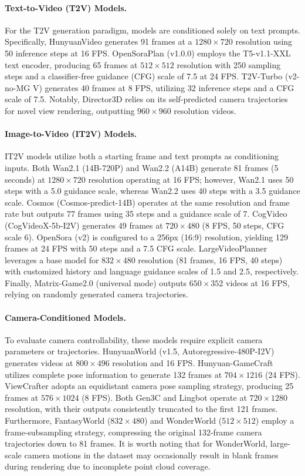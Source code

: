 \paragraph{Text-to-Video (T2V) Models.}
For the T2V generation paradigm, models are conditioned solely on text prompts. Specifically, HunyuanVideo generates 91 frames at a $1280\times 720$ resolution using 50 inference steps at 16 FPS. OpenSoraPlan (v1.0.0) employs the T5-v1.1-XXL text encoder, producing 65 frames at $512\times 512$ resolution with 250 sampling steps and a classifier-free guidance (CFG) scale of 7.5 at 24 FPS. T2V-Turbo (v2-no-MG V) generates 40 frames at 8 FPS, utilizing 32 inference steps and a CFG scale of 7.5. Notably, Director3D relies on its self-predicted camera trajectories for novel view rendering, outputting $960\times 960$ resolution videos.

\paragraph{Image-to-Video (IT2V) Models.}
IT2V models utilize both a starting frame and text prompts as conditioning inputs. Both Wan2.1 (14B-720P) and Wan2.2 (A14B) generate 81 frames (5 seconds) at $1280\times 720$ resolution operating at 16 FPS; however, Wan2.1 uses 50 steps with a 5.0 guidance scale, whereas Wan2.2 uses 40 steps with a 3.5 guidance scale. Cosmos (Cosmos-predict-14B) operates at the same resolution and frame rate but outputs 77 frames using 35 steps and a guidance scale of 7. CogVideo (CogVideoX-5b-I2V) generates 49 frames at $720\times 480$ (8 FPS, 50 steps, CFG scale 6). OpenSora (v2) is configured to a 256px (16:9) resolution, yielding 129 frames at 24 FPS with 50 steps and a 7.5 CFG scale. LargeVideoPlanner leverages a base model for $832\times 480$ resolution (81 frames, 16 FPS, 40 steps) with customized history and language guidance scales of 1.5 and 2.5, respectively. Finally, Matrix-Game2.0 (universal mode) outputs $650\times 352$ videos at 16 FPS, relying on randomly generated camera trajectories.

\paragraph{Camera-Conditioned Models.}
To evaluate camera controllability, these models require explicit camera parameters or trajectories. HunyuanWorld (v1.5, Autoregressive-480P-I2V) generates videos at $800\times 496$ resolution and 16 FPS. Hunyuan-GameCraft utilizes complete pose information to generate 132 frames at $704\times 1216$ (24 FPS). ViewCrafter adopts an equidistant camera pose sampling strategy, producing 25 frames at $576\times 1024$ (8 FPS). Both Gen3C and Lingbot operate at $720\times 1280$ resolution, with their outputs consistently truncated to the first 121 frames. Furthermore, FantasyWorld ($832\times 480$) and WonderWorld ($512\times 512$) employ a frame-subsampling strategy, compressing the original 132-frame camera trajectories down to 81 frames. It is worth noting that for WonderWorld, large-scale camera motions in the dataset may occasionally result in blank frames during rendering due to incomplete point cloud coverage.


